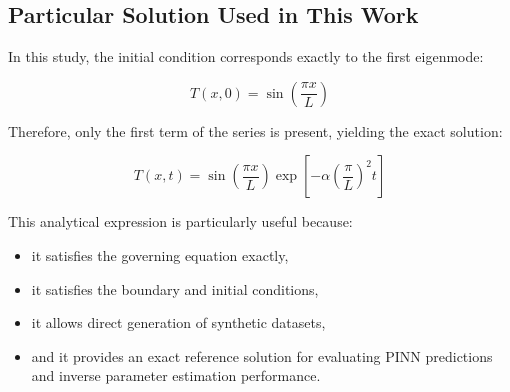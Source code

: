 \subsection{Particular Solution Used in This Work}

In this study, the initial condition corresponds exactly to the first eigenmode:

\begin{equation}
T(x,0)
=
\sin\left(\frac{\pi x}{L}\right)
\end{equation}

Therefore, only the first term of the series is present, yielding the exact solution:

\begin{equation}
T(x,t)
=
\sin\left(\frac{\pi x}{L}\right)
\exp\left[
-\alpha
\left(
\frac{\pi}{L}
\right)^2
t
\right]
\end{equation}

This analytical expression is particularly useful because:
\begin{itemize}
    \item it satisfies the governing equation exactly,
    \item it satisfies the boundary and initial conditions,
    \item it allows direct generation of synthetic datasets,
    \item and it provides an exact reference solution for evaluating PINN predictions and inverse parameter estimation performance.
\end{itemize}